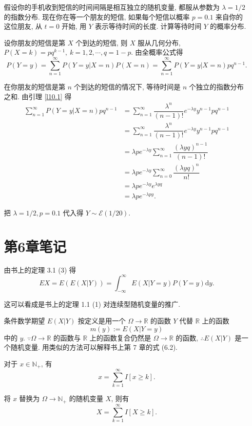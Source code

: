 \documentclass[color=black,device=normal,lang=cn]{elegantnote}
\numberwithin{equation}{section}
\theoremstyle{plain}
\numberwithin{exercise}{exsection}
\begin{document}
\begin{exercise}[a]\label{ex5.36}
    假设你的手机收到短信的时间间隔是相互独立的随机变量, 都服从参数为 $\lambda=1/2$ 的指数分布. 现在你在等一个朋友的短信, 如果每个短信以概率 $p=0.1$ 来自你的这位朋友, 从 $t=0$ 开始, 用 $Y$ 表示等待时间的长度. 计算等待时间 $Y$ 的概率分布.
\end{exercise}
\begin{solution}
    设你朋友的短信是第 $X$ 个到达的短信, 则 $X$ 服从几何分布, $P(X=k)=pq^{k-1},\ k=1,2,\cdots,q=1-p$. 由全概率公式得
    \[P(Y=y)=\sum\limits_{n=1}^\infty P(Y=y|X=n)P(X=n)=\sum\limits_{n=1}^\infty P(Y=y|X=n)pq^{n-1}.\]

    在你朋友的短信是第 $n$ 个到达的短信的情况下, 等待时间是 $n$ 个独立的指数分布之和. 由引理 \ref{l10.1} 得
    \begin{align*}
        \sum\limits_{n=1}^\infty P(Y=y|X=n)pq^{n-1} & =\sum\limits_{n=1}^\infty\dfrac{\lambda^n}{(n-1)!}e^{-\lambda y}y^{n-1}pq^{n-1} \\
        & =\sum\limits_{n=1}^\infty\dfrac{\lambda^n}{(n-1)!}e^{-\lambda y}y^{n-1}pq^{n-1} \\
        & =\lambda pe^{-\lambda y}\sum\limits_{n=1}^\infty\dfrac{(\lambda yq)^{n-1}}{(n-1)!} \\
        & =\lambda pe^{-\lambda y}\sum\limits_{n=0}^\infty\dfrac{(\lambda yq)^n}{n!} \\
        & =\lambda pe^{-\lambda y}e^{\lambda yq} \\
        & =\lambda pe^{-\lambda py}.
    \end{align*}

    把 $\lambda=1/2,p=0.1$ 代入得 $Y\sim\mathcal{E}(1/20)$.
\end{solution}
\section{第6章笔记}
由书上的定理 3.1 (3) 得
\[EX=E(E(X|Y))=\int_{-\infty}^\infty E(X|Y=y)P(Y=y)\mathrm{d}y.\]

这可以看成是书上的定理 1.1 (1) 对连续型随机变量的推广.

条件数学期望 $E(X|Y)$ 按定义是用一个 $\Omega\to\mathbb{R}$ 的函数 $Y$ 代替 $\mathbb{R}$ 上的函数
\[m(y):=E(X|Y=y)\]
中的 $y$. $\because\Omega\to\mathbb{R}$ 的函数与 $\mathbb{R}$ 上的函数复合仍然是 $\Omega\to\mathbb{R}$ 的函数, $\therefore E(X|Y)$ 是一个随机变量. 用类似的方法可以解释书上第 7 章的式 (6.2).
\begin{example}
    对于 $x\in\mathbb{N}_+$, 有
    \[x=\sum\limits_{k=1}^\infty I[x\geq k].\]

    将 $x$ 替换为 $\Omega\to\mathbb{N}_+$ 的随机变量 $X$, 则有
    \[X=\sum\limits_{k=1}^\infty I[X\geq k].\]
\end{example}
\end{document}

